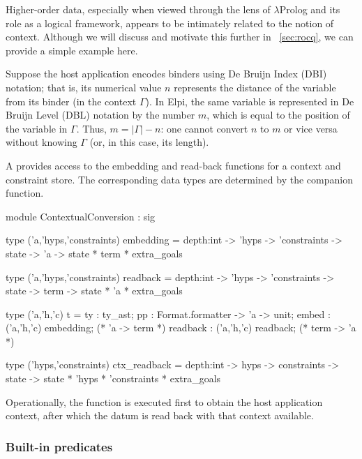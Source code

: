 \documentclass{these-ISSS}
\newenvironment{ocamlcode}
  {\VerbatimEnvironment\begin{ocamlbox}\begin{xocamlcode}}{\end{xocamlcode}
\end{ocamlbox}}
\begin{document}
Higher-order data, especially when viewed through the lens of $\lambda$Prolog
and its role as a logical framework, appears to be intimately related to the
notion of context. Although we will discuss and motivate this further in
~\cref{sec:rocq}, we can provide a simple example here.

Suppose the host application encodes binders using De Bruijn Index (DBI)
notation; that is, its numerical value $n$ represents the distance of the
variable from its binder (in the context $\Gamma$). In Elpi, the same variable
is represented in De Bruijn Level (DBL) notation by the number $m$, which is
equal to the position of the variable in $\Gamma$. Thus, $m = |\Gamma| - n$:
one cannot convert $n$ to $m$ or vice versa without knowing $\Gamma$ (or, in
this case, its length).

A  provides access to the embedding and
read-back functions for a context and constraint store. The corresponding data
types are determined by the  companion function.

\begin{ocamlcode}
module ContextualConversion : sig

type ('a,'hyps,'constraints) embedding =
  depth:int -> 'hyps -> 'constraints ->
  state -> 'a -> state * term * extra_goals

type ('a,'hyps,'constraints) readback =
  depth:int -> 'hyps -> 'constraints ->
  state -> term -> state * 'a * extra_goals

type ('a,'h,'c) t = {
  ty : ty_ast;
  pp : Format.formatter -> 'a -> unit;
  embed : ('a,'h,'c) embedding;   (* 'a -> term *)
  readback : ('a,'h,'c) readback; (* term -> 'a *)
}

type ('hyps,'constraints) ctx_readback =
  depth:int -> hyps -> constraints ->
  state -> state * 'hyps * 'constraints * extra_goals
\end{ocamlcode}

\noindent
Operationally, the  function is executed first to obtain
the host application context, after which the datum is read back with that
context available.

\subsubsection{Built-in predicates}\label{sec:builtins}
\end{document}
